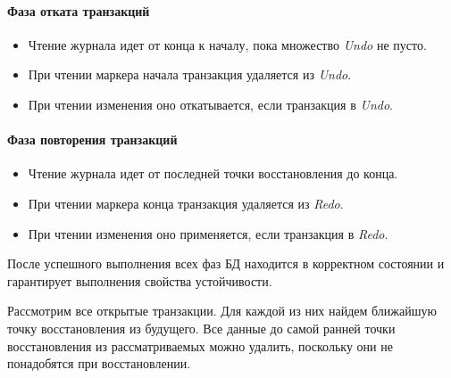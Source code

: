 \paragraph{Фаза отката транзакций}

\begin{itemize}
	\item Чтение журнала идет от конца к началу, пока множество \textit{Undo} не пусто.
	\item При чтении маркера начала транзакция удаляется из \textit{Undo}.
	\item При чтении изменения оно откатывается, если транзакция в \textit{Undo}.
\end{itemize}

\paragraph{Фаза повторения транзакций}

\begin{itemize}
	\item Чтение журнала идет от последней точки восстановления до конца.
	\item При чтении маркера конца транзакция удаляется из \textit{Redo}.
	\item При чтении изменения оно применяется, если транзакция в \textit{Redo}.
\end{itemize}

\begin{proposition}
	После успешного выполнения всех фаз БД находится в корректном состоянии и гарантирует выполнения
	свойства устойчивости.
\end{proposition}

\begin{proposition}
	Рассмотрим все открытые транзакции. Для каждой из них найдем ближайшую точку восстановления из
	будущего. Все данные до самой ранней точки восстановления из рассматриваемых можно удалить,
	поскольку они не понадобятся при восстановлении.
\end{proposition}
